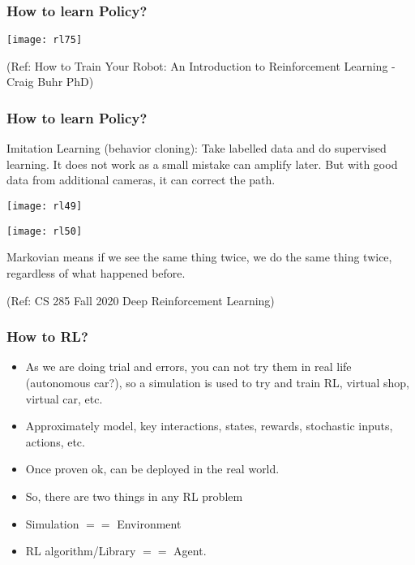\begin{frame}[fragile]\frametitle{How to learn Policy?}


\begin{center}
\texttt{[image: rl75]}
\end{center}

{\tiny (Ref: How to Train Your Robot: An Introduction to Reinforcement Learning - Craig Buhr PhD)}

\end{frame}


\begin{frame}[fragile]\frametitle{How to learn Policy?}

Imitation Learning (behavior cloning): Take labelled data and do supervised learning. It does not work as a small mistake can amplify later. But with good data from additional cameras, it can correct the path.


\begin{center}
\texttt{[image: rl49]}

\texttt{[image: rl50]}

\end{center}

Markovian means if we see the same thing twice, we do the same thing twice, regardless of what happened before.


{\tiny (Ref: CS 285 Fall 2020 Deep Reinforcement Learning)}

\end{frame}

\begin{frame}[fragile]\frametitle{How to RL?}

\begin{itemize}
\item As we are doing trial and errors, you can not try them in real life (autonomous car?), so a simulation is used to try and train RL, virtual shop, virtual car, etc.
\item Approximately model, key interactions, states, rewards, stochastic inputs, actions, etc.
\item Once proven ok, can be deployed in the real world.
\item So, there are two things in any RL problem
\item Simulation $==$ Environment
\item RL algorithm/Library $==$ Agent.
\end{itemize}
\end{frame}

